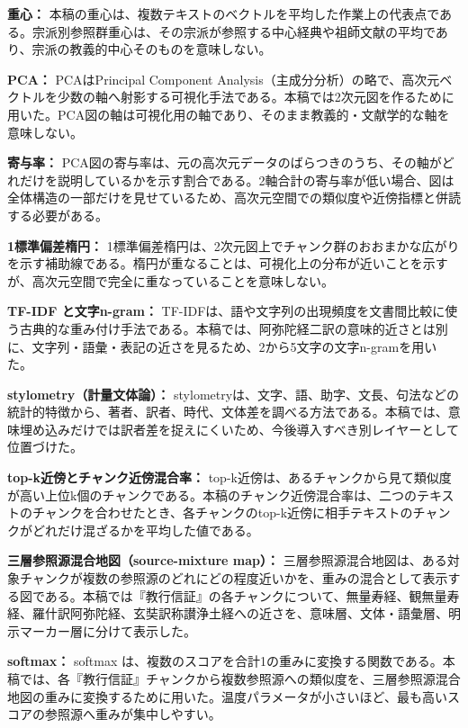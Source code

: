 \documentclass[uplatex,dvipdfmx,11pt,a4paper]{jsarticle}
\begin{document}
\noindent\textbf{重心：} 本稿の重心は、複数テキストのベクトルを平均した作業上の代表点である。宗派別参照群重心は、その宗派が参照する中心経典や祖師文献の平均であり、宗派の教義的中心そのものを意味しない。

\noindent\textbf{PCA：} PCAはPrincipal Component Analysis（主成分分析）の略で、高次元ベクトルを少数の軸へ射影する可視化手法である\cite{jolliffe2002,pedregosa2011}。本稿では2次元図を作るために用いた。PCA図の軸は可視化用の軸であり、そのまま教義的・文献学的な軸を意味しない。

\noindent\textbf{寄与率：} PCA図の寄与率は、元の高次元データのばらつきのうち、その軸がどれだけを説明しているかを示す割合である。2軸合計の寄与率が低い場合、図は全体構造の一部だけを見せているため、高次元空間での類似度や近傍指標と併読する必要がある。

\noindent\textbf{1標準偏差楕円：} 1標準偏差楕円は、2次元図上でチャンク群のおおまかな広がりを示す補助線である。楕円が重なることは、可視化上の分布が近いことを示すが、高次元空間で完全に重なっていることを意味しない。

\noindent\textbf{TF-IDF と文字n-gram：} TF-IDFは、語や文字列の出現頻度を文書間比較に使う古典的な重み付け手法である\cite{salton1988}。本稿では、阿弥陀経二訳の意味的近さとは別に、文字列・語彙・表記の近さを見るため、2から5文字の文字n-gramを用いた。

\noindent\textbf{stylometry（計量文体論）：} stylometryは、文字、語、助字、文長、句法などの統計的特徴から、著者、訳者、時代、文体差を調べる方法である。本稿では、意味埋め込みだけでは訳者差を捉えにくいため、今後導入すべき別レイヤーとして位置づけた。

\noindent\textbf{top-k近傍とチャンク近傍混合率：} top-k近傍は、あるチャンクから見て類似度が高い上位k個のチャンクである。本稿のチャンク近傍混合率は、二つのテキストのチャンクを合わせたとき、各チャンクのtop-k近傍に相手テキストのチャンクがどれだけ混ざるかを平均した値である。

\noindent\textbf{三層参照源混合地図（source-mixture map）：} 三層参照源混合地図は、ある対象チャンクが複数の参照源のどれにどの程度近いかを、重みの混合として表示する図である。本稿では『教行信証』の各チャンクについて、無量寿経、観無量寿経、羅什訳阿弥陀経、玄奘訳称讃浄土経への近さを、意味層、文体・語彙層、明示マーカー層に分けて表示した。

\noindent\textbf{softmax：} softmax は、複数のスコアを合計1の重みに変換する関数である。本稿では、各『教行信証』チャンクから複数参照源への類似度を、三層参照源混合地図の重みに変換するために用いた。温度パラメータが小さいほど、最も高いスコアの参照源へ重みが集中しやすい。
\end{document}
